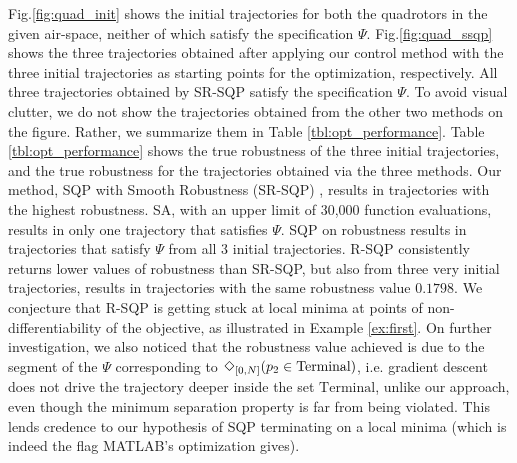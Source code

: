 Fig.\ref{fig:quad_init} shows the initial trajectories for both the quadrotors in the given air-space, neither of which satisfy the specification $\Psi$. 
Fig.\ref{fig:quad_ssqp} shows the three trajectories obtained after applying our control method
 with the three initial trajectories as starting points 
for the optimization, respectively. 
All three trajectories obtained by SR-SQP satisfy the specification $\Psi$. 
To avoid visual clutter, we do not show the trajectories obtained from the other two methods on the figure.
Rather, we summarize them in Table \ref{tbl:opt_performance}. 
Table \ref{tbl:opt_performance} shows the true robustness of the three initial trajectories, and
the true robustness for the trajectories obtained via the three methods. 
Our method, SQP with Smooth Robustness (SR-SQP)
, 
results in trajectories with the highest robustness.
SA, with an upper limit of 30,000 function evaluations, results in only one trajectory that satisfies $\Psi$. 
SQP on robustness 
results in trajectories that satisfy $\Psi$ from all 3 initial trajectories. 
R-SQP consistently returns lower values of robustness than SR-SQP, but also from three very initial trajectories, 
results in trajectories with the same robustness value $0.1798$. 
We conjecture that R-SQP is getting stuck at local minima at points of non-differentiability of the objective, as illustrated in Example \ref{ex:first}.
On further investigation, we also noticed that the robustness value achieved is due to the segment of the $\Psi$ corresponding to $\Diamond_{[0,N]}(p_2 \in \text{Terminal})$, i.e. gradient descent does not drive the trajectory deeper inside the set $\text{Terminal}$, unlike our approach, even though the minimum separation property is far from being violated. This lends credence to our hypothesis of SQP terminating on a local minima (which is indeed the flag MATLAB's optimization gives).


